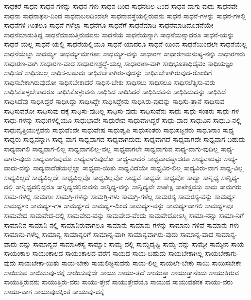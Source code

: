 {ಸಾಧಕರೆ
ಸಾಧನ
ಸಾಧನ-ಗಳನ್ನು
ಸಾಧನ-ಗಳು
ಸಾಧನ-ದಿಂದ
ಸಾಧನಬಲ-ದಿಂದ
ಸಾಧನ-ವಾಗು-ವುದು
ಸಾಧನವೇ
ಸಾಧನಾ
ಸಾಧನಾಫಲ-ದಿಂದ
ಸಾಧನಾಬಲದಿಂದಲೇ
ಸಾಧನಾವಸ್ಥೆಯಲ್ಲಿರುವನು
ಸಾಧನೆ
ಸಾಧನೆ-ಗಳನ್ನು
ಸಾಧನೆ-ಗಳಲ್ಲಿ
ಸಾಧನೆಗಳಿ-ಗಿಂತಲೂ
ಸಾಧನೆ-ಗಳೆಲ್ಲಾ
ಸಾಧನೆಗೂ
ಸಾಧನೆಗೆ
ಸಾಧನೆಮಾಡಿ
ಸಾಧನೆಮಾಡಿದೊಡನೆಯೇ
ಸಾಧನೆಮಾಡುತ್ತಿದ್ದ
ಸಾಧನೆಮಾಡುತ್ತಿರುವವನು
ಸಾಧನೆಯ
ಸಾಧನೆಯನ್ನಾಗಿ
ಸಾಧನೆಯನ್ನಾದರೂ
ಸಾಧನೆ-ಯನ್ನು
ಸಾಧನೆ-ಯಲ್ಲ
ಸಾಧನೆ-ಯಲ್ಲಿ
ಸಾಧನೆಯಲ್ಲಿಯೂ
ಸಾಧನೆ-ಯಾದರೂ
ಸಾಧನೆ-ಯಿಂದ
ಸಾಧನೆಯಿಂದಲೇ
ಸಾಧನೆಯೆಲ್ಲ
ಸಾಧನೆಯೆಲ್ಲಾ
ಸಾಧರ್ಮ್ಯ
ಸಾಧರ್ಮ್ಯಮಾಗತಾಃ
ಸಾಧರ್ಮ್ಯ-ವನ್ನು
ಸಾಧಾರಣ
ಸಾಧಾರಣಮನುಷ್ಯ-ನನ್ನು
ಸಾಧಾರಣರು
ಸಾಧಾರಣ-ವಾಗಿ
ಸಾಧಾರಣ-ವಾದ
ಸಾಧಾರಣಶ್ರದ್ಧೆ-ಯಲ್ಲ
ಸಾಧಾರಾಣ-ವಾಗಿ
ಸಾಧಿಭೂತಾಧಿದೈವಂ
ಸಾಧಿಯಜ್ಞಂ
ಸಾಧಿಸದೆ
ಸಾಧಿಸಬಲ್ಲ
ಸಾಧಿಸ-ಬಹುದು
ಸಾಧಿಸಬೇಕಾಗಿರು-ವುದನ್ನು
ಸಾಧಿಸಬೇಕಾಗಿರುವುದ-ರೊಂದಿಗೆ
ಸಾಧಿಸಬೇಕಾಗಿರುವುದೋ
ಸಾಧಿಸಬೇಕಾದರೆ
ಸಾಧಿಸ-ಬೇಕು
ಸಾಧಿಸಲು
ಸಾಧಿಸಲೂ
ಸಾಧಿಸಲೆತ್ನಿಸು-ವರು
ಸಾಧಿಸಿಕೊಳ್ಳಬೇಕಾದರೂ
ಸಾಧಿಸಿಕೊಳ್ಳುವನು
ಸಾಧಿಸಿದ
ಸಾಧಿಸಿದರೆ
ಸಾಧಿಸಿದವನು
ಸಾಧಿಸಿದುದನ್ನು
ಸಾಧಿಸಿದೆ
ಸಾಧಿಸಿದೆವು
ಸಾಧಿಸಿದ್ದರೆ
ಸಾಧಿಸಿದ್ದು
ಸಾಧಿಸಿದ್ದೇ
ಸಾಧಿಸಿದ್ದೇನು
ಸಾಧಿಸಿರು-ವುದನ್ನು
ಸಾಧಿಸು-ತ್ತಾನೆ
ಸಾಧಿಸುವ
ಸಾಧಿಸುವರೋ
ಸಾಧಿಸುವು-ದಕ್ಕೆ
ಸಾಧಿಸು-ವುದಿಲ್ಲ
ಸಾಧಿಸು-ವುದು
ಸಾಧಿಸುವೆನು
ಸಾಧು
ಸಾಧು-ಸಂತರು
ಸಾಧು-ಗಳ
ಸಾಧು-ಗಳನ್ನು
ಸಾಧುಗಳಲ್ಲಿಯೂ
ಸಾಧುಭಾವೇ
ಸಾಧುರೇವ
ಸಾಧುವಾಗಿದ್ದರೆ
ಸಾಧು-ವಾದ
ಸಾಧುವಿನ
ಸಾಧುವಿ-ನಲ್ಲಿ
ಸಾಧುವೃತ್ತಿಯುಳ್ಳವನು
ಸಾಧುವೆಂದೇ
ಸಾಧುವೇಷ
ಸಾಧುಷ್ವಪಿ
ಸಾಧುಸಂತರು
ಸಾಧುಸಜ್ಜನರು
ಸಾಧೂನಾಂ
ಸಾಧ್ಯ
ಸಾಧ್ಯರು
ಸಾಧ್ಯವನ್ನಾಗಿ
ಸಾಧ್ಯ-ವಾಗ
ಸಾಧ್ಯವಾಗದ
ಸಾಧ್ಯವಾಗದುದು
ಸಾಧ್ಯವಾಗದೆ
ಸಾಧ್ಯವಾಗದೇ
ಸಾಧ್ಯವಾಗ-ಬಹುದು
ಸಾಧ್ಯವಾಗಲಿ
ಸಾಧ್ಯವಾಗ-ಲಿಲ್ಲ
ಸಾಧ್ಯವಾಗಲಿಲ್ಲ-ವಲ್ಲ
ಸಾಧ್ಯವಾಗಲೇ
ಸಾಧ್ಯವಾಗುವ
ಸಾಧ್ಯ-ವಾಗು-ವುದಿಲ್ಲ
ಸಾಧ್ಯ-ವಾಗು-ವುದು
ಸಾಧ್ಯವಾಗುವುದೊ
ಸಾಧ್ಯವಾಗುವುದೋ
ಸಾಧ್ಯ-ವಾದರೆ
ಸಾಧ್ಯವಾದಷ್ಟಾದರೂ
ಸಾಧ್ಯವಾದಷ್ಟು
ಸಾಧ್ಯ-ವಾದು-ದನ್ನು
ಸಾಧ್ಯವಾದೆಡೆಯಲ್ಲೆಲ್ಲಾ
ಸಾಧ್ಯವಾ-ಯಿತು
ಸಾಧ್ಯವಿದೆಯೇ
ಸಾಧ್ಯವಿರ-ಲಿಲ್ಲ
ಸಾಧ್ಯವಿರು-ವಾಗ
ಸಾಧ್ಯ-ವಿಲ್ಲ
ಸಾಧ್ಯವಿಲ್ಲದೆ
ಸಾಧ್ಯವಿಲ್ಲದೇ
ಸಾಧ್ಯವಿಲ್ಲವೊ
ಸಾಧ್ಯವಿಲ್ಲವೋ
ಸಾಧ್ಯವೆ
ಸಾಧ್ಯವೇ
ಸಾಧ್ಯವೋ
ಸಾಧ್ಯಾ
ಸಾನ್ನಿಧ್ಯ
ಸಾನ್ನಿಧ್ಯ-ದಲ್ಲಿ
ಸಾನ್ನಿಧ್ಯದಲ್ಲಿದ್ದರೂ
ಸಾನ್ನಿಧ್ಯದಲ್ಲಿರುವನು
ಸಾನ್ನಿಧ್ಯ-ವನ್ನು
ಸಾನ್ನಿಧ್ಯವೇ
ಸಾಪೇಕ್ಷ
ಸಾಪೇಕ್ಷವಸ್ತು
ಸಾಮ
ಸಾಮಗರು
ಸಾಮ-ಗಳಲ್ಲಿ
ಸಾಮಗಾಃ
ಸಾಮಗ್ರಿ-ಗಳನ್ನು
ಸಾಮಗ್ರಿ-ಗಳು
ಸಾಮಗ್ರಿ-ಗಳೆಲ್ಲ
ಸಾಮರಸ್ಯ
ಸಾಮರಸ್ಯ-ವನ್ನು
ಸಾಮರ್ಥ್ಯ
ಸಾಮರ್ಥ್ಯಂ
ಸಾಮರ್ಥ್ಯ-ಗಳ
ಸಾಮರ್ಥ್ಯದ
ಸಾಮರ್ಥ್ಯ-ದಿಂದ
ಸಾಮರ್ಥ್ಯ-ವನ್ನು
ಸಾಮರ್ಥ್ಯವಾಗಲಿ
ಸಾಮರ್ಥ್ಯವೂ
ಸಾಮವೇದ
ಸಾಮವೇದ-ದಲ್ಲಿ
ಸಾಮವೇದ-ವನ್ನು
ಸಾಮವೇದ-ವೆಂದು
ಸಾಮವೇದೋಽಸ್ಮಿ
ಸಾಮಾ-ನನ್ನು
ಸಾಮಾ-ನಿಗೆ
ಸಾಮಾನಿನ
ಸಾಮಾನಿ-ನಲ್ಲಿ
ಸಾಮಾನಿರುವಾಗಲೂ
ಸಾಮಾನು
ಸಾಮಾನು-ಗಳನ್ನು
ಸಾಮಾನು-ಗಳಿವೆ
ಸಾಮಾನು-ಗಳು
ಸಾಮಾನು-ಗಳೆಲ್ಲ
ಸಾಮಾನ್ಯ
ಸಾಮಾನ್ಯರಿಗೆ
ಸಾಮಾನ್ಯ-ವಾಗಿ
ಸಾಮಾನ್ಯವಾಗಿರು-ವುದು
ಸಾಮಾನ್ಯ-ವಾದ
ಸಾಮಾನ್ಯ-ವಾದು-ದನ್ನು
ಸಾಮಾನ್ಯವೆ
ಸಾಮಾಸಿಕಸ್ಯ
ಸಾಮ್ನಾಂ
ಸಾಮ್ಯ-ದಲ್ಲಿ
ಸಾಮ್ಯದೃಷ್ಟಿ
ಸಾಮ್ಯ-ವನ್ನು
ಸಾಮ್ಯೇ
ಸಾಮ್ಯೇನ
ಸಾಯ
ಸಾಯಂಕಾಲ
ಸಾಯಂಕಾಲದ
ಸಾಯಂಕಾಲದ-ವರೆಗೆ
ಸಾಯದ
ಸಾಯ-ಬಹುದು
ಸಾಯಬೇಕಾಗಿಲ್ಲ
ಸಾಯಬೇಕಾಗು-ವುದು
ಸಾಯಬೇಕಾ-ಯಿತು
ಸಾಯ-ಬೇಕು
ಸಾಯಲಿಚ್ಛಿಸುವನು
ಸಾಯ-ಲಿಲ್ಲ
ಸಾಯಲೇ-ಬೇಕು
ಸಾಯಿ
ಸಾಯಿಸಬೇಕೇ
ಸಾಯಿಸುವ
ಸಾಯಿಸುವು-ದಕ್ಕೆ
ಸಾಯಿಸುವುದೇ
ಸಾಯು
ಸಾಯು-ತ್ತದೆ
ಸಾಯುತ್ತಾ
ಸಾಯುತ್ತಾನೆಂದು
ಸಾಯುತ್ತಿರುವ
ಸಾಯುತ್ತಿರುವನು
ಸಾಯುತ್ತಿರು-ವರು
ಸಾಯು-ತ್ತೇನೆ
ಸಾಯುತ್ತೇವೆಯೊ
ಸಾಯುವ
ಸಾಯುವತನಕ
ಸಾಯು-ವರು
ಸಾಯು-ವಾಗ
ಸಾಯುವುದಕ್ಕಿಂತ
ಸಾಯುವು-ದಕ್ಕೆ
}
